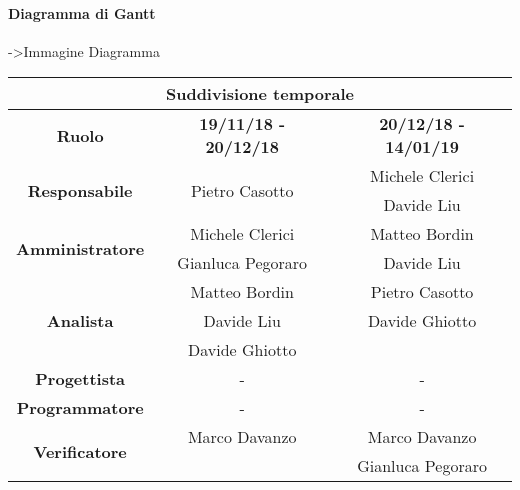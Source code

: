 \paragraph{Diagramma di Gantt}
->Immagine Diagramma


\begin{tabular}{|c|c|c|}
	\hline
	\multicolumn{3}{|c|}{\textbf{Suddivisione temporale}}\\
	\hline
	\textbf{Ruolo} & \textbf{19/11/18 - 20/12/18} & \textbf{20/12/18 - 14/01/19} \\
	\hline
	\multirow{2}{*}{\textbf{Responsabile}} & \multirow{2}{*}{Pietro Casotto}  & Michele Clerici \\ && Davide Liu  \\
	\hline
	\multirow{2}{*}{\textbf{Amministratore}} & Michele Clerici  & Matteo Bordin\\
	& Gianluca Pegoraro & Davide Liu \\
	\hline
	\multirow{3}{*}{\textbf{Analista}} & Matteo Bordin & Pietro Casotto\\ & Davide Liu &  Davide Ghiotto\\ & Davide Ghiotto & \\
	\hline
	\textbf{Progettista} & - & - \\
	\hline
	\textbf{Programmatore} & - & - \\
	\hline
	\multirow{3}{*}{\textbf{Verificatore}} & Marco Davanzo & Marco Davanzo\\ && Gianluca Pegoraro \\
	\hline
\end{tabular}

